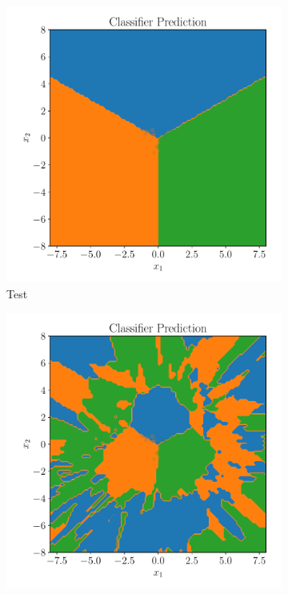 \begin{figure}[htpb]
    \centering
    \begin{subfigure}[]{0.4\textwidth}
        \centering
        \includegraphics[width=\linewidth]{figures/toy_example/gaussian_mixture/classifier_class.pdf}
        \caption{Test}
        \label{fig:gmm_class}
    \end{subfigure}
    \begin{subfigure}[]{0.4\textwidth}
        \centering
        \includegraphics[width=\linewidth]{figures/toy_example/gaussian_mixture/classifier_kl_class.pdf}

\end{subfigure}
\end{figure}

